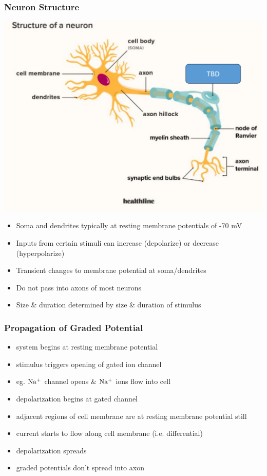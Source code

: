 \documentclass[11pt,fleqn]{book}
\begin{document}
\subsubsection{Neuron Structure}
\begin{center}
    \includegraphics[width=0.65\linewidth]{Pictures/Screenshot 2024-02-25 224731.png}
\end{center}
\begin{itemize}
    \item Soma and dendrites typically at resting membrane potentials of -70 mV
    \item Inputs from certain stimuli can increase (depolarize) or decrease (hyperpolarize)
    \item Transient changes to membrane potential at soma/dendrites
    \item Do not pass into axons of most neurons
    \item Size \& duration determined by size \& duration of stimulus
\end{itemize}
\subsubsection{Propagation of Graded Potential}
\begin{itemize}
    \item system begins at resting membrane potential
    \item stimulus triggers opening of gated ion channel
    \item eg. $\rm{Na^+}$ channel opens \& $\rm{Na^+}$ ions flow into cell
    \item depolarization begins at gated channel
    \item adjacent regions of cell membrane are at resting membrane potential still
    \item current starts to flow along cell membrane (i.e. differential)
    \item depolarization spreads
    \item graded potentials don't spread into axon
\end{itemize}
\end{document}
